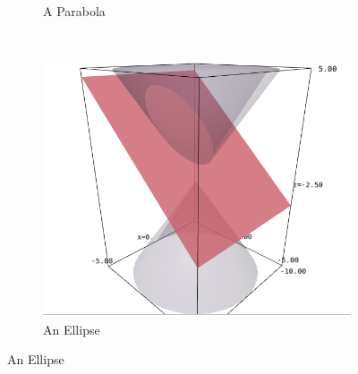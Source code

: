 \documentclass{article}
\theoremstyle{definition}
\begin{document}
\begin{figure}[H]
\begin{subfigure}[b]{0.3\textwidth}
\caption{A Parabola}
\label{fig:tiger23}
\end{subfigure}
~ %
\begin{subfigure}[b]{0.3\textwidth}
\includegraphics[width=\textwidth]{Selection_052}
\caption{An Ellipse}
\label{fig:mouse2}
\end{subfigure}


\end{figure}
\end{document}

